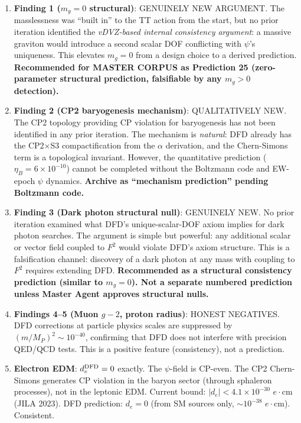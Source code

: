 \documentclass[11pt]{article}
\begin{document}
\begin{enumerate}
\item \textbf{Finding 1 ($m_g = 0$ structural)}: GENUINELY NEW ARGUMENT.
  The masslessness was ``built in'' to the TT action from the start,
  but no prior iteration identified the \emph{vDVZ-based internal
  consistency argument}: a massive graviton would introduce a second
  scalar DOF conflicting with $\psi$'s uniqueness.  This elevates
  $m_g = 0$ from a design choice to a derived prediction.
  \textbf{Recommended for MASTER CORPUS as Prediction 25 (zero-parameter
  structural prediction, falsifiable by any $m_g > 0$ detection).}

\item \textbf{Finding 2 (CP2 baryogenesis mechanism)}: QUALITATIVELY
  NEW.  The CP2 topology providing CP violation for baryogenesis has
  not been identified in any prior iteration.  The mechanism is
  \emph{natural}: DFD already has the CP2$\times$S3 compactification
  from the $\alpha$ derivation, and the Chern-Simons term is a
  topological invariant.  However, the quantitative prediction
  ($\eta_B = 6 \times 10^{-10}$) cannot be completed without the
  Boltzmann code and EW-epoch $\psi$ dynamics.
  \textbf{Archive as ``mechanism prediction'' pending Boltzmann code.}

\item \textbf{Finding 3 (Dark photon structural null)}: GENUINELY NEW.
  No prior iteration examined what DFD's unique-scalar-DOF axiom
  implies for dark photon searches.  The argument is simple but
  powerful: any additional scalar or vector field coupled to $F^2$
  would violate DFD's axiom structure.  This is a falsification
  channel: discovery of a dark photon at any mass with coupling to
  $F^2$ requires extending DFD.
  \textbf{Recommended as a structural consistency prediction (similar
  to $m_g = 0$).  Not a separate numbered prediction unless Master
  Agent approves structural nulls.}

\item \textbf{Findings 4--5 (Muon $g-2$, proton radius)}: HONEST
  NEGATIVES.  DFD corrections at particle physics scales are
  suppressed by $(m/M_P)^2 \sim 10^{-40}$, confirming that DFD does
  not interfere with precision QED/QCD tests.  This is a positive
  feature (consistency), not a prediction.

\item \textbf{Electron EDM}: $d_e^{\rm DFD} = 0$ exactly.  The
  $\psi$-field is CP-even.  The CP2 Chern-Simons generates CP
  violation in the baryon sector (through sphaleron processes), not
  in the leptonic EDM.  Current bound: $|d_e| < 4.1 \times 10^{-30}$
  $e\cdot$cm (JILA 2023).  DFD prediction: $d_e = 0$ (from SM
  sources only, $\sim 10^{-38}$ $e\cdot$cm).  Consistent.
\end{enumerate}
\end{document}
